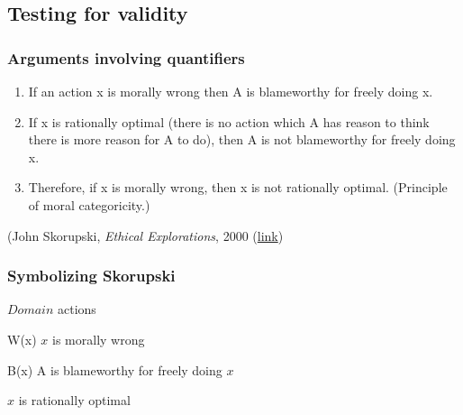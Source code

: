 \subsection{Testing for validity}

\begin{frame}
\frametitle{Arguments involving quantifiers}

\begin{enumerate}[<+->]
\item If an action x is morally wrong then
A is blameworthy for freely doing x.
\item If x is rationally optimal (there is no action which A has
  reason to think there is more reason for A to do), then A is not
  blameworthy for freely doing x.
\item Therefore, if x is morally wrong, then
x is not rationally optimal.
(Principle of moral categoricity.)
\end{enumerate}

\begin{raggedleft}
\small(John Skorupski, \textit{Ethical Explorations}, 2000 (\href{http://books.google.ca/books?id=bxIzZYqRZdwC&lpg=PP1&pg=PA170\#v=onepage&q&f=false}{link})
 \end{raggedleft}

\end{frame}

\begin{frame}
  \frametitle{Symbolizing Skorupski}

  \begin{enumerate}
    \end{enumerate}

  \begin{ekey}
  \item[$Domain$] actions
  \item[W(x)] $x$ is morally wrong
  \item[B(x)] A is blameworthy for freely doing $x$
  \item<3->[O(x)] $x$ is rationally optimal
  \end{ekey}
  \begin{earg}
  \item<1->[] 
  \item<3->[] 
  \item<5->[\therefore] 
  \end{earg}

  \end{frame}

